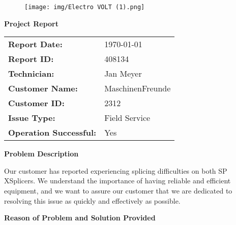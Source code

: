 \documentclass{article}
\begin{document}
\pagestyle{fancy}


\begin{figure}[htbp]
	\centering
	\texttt{[image: img/Electro VOLT (1).png]}
\end{figure}

\begin{center}
    \Huge \textbf{Project Report}
\end{center}

\vspace{5em}

\begin{tabularx}{\textwidth}{@{}l X@{}}
    \textbf{Report Date:} & \today \\
    \textbf{Report ID:} & 408134 \\
    \textbf{Technician:} & Jan Meyer \\
    \textbf{Customer Name:} & MaschinenFreunde \\
    \textbf{Customer ID:} & 2312 \\
    \textbf{Issue Type:} & Field Service \\
    \textbf{Operation Successful:} & Yes \\
\end{tabularx}

\vspace{0.25em}
\newpage

\begin{center}
    \textbf{Problem Description}
\end{center}

\vspace{0.25em}
Our customer has reported experiencing splicing difficulties on both SP XSplicers. We understand the importance of having reliable and efficient equipment, and we want to assure our customer that we are dedicated to resolving this issue as quickly and effectively as possible. 

\vspace{0.25em}

\begin{center}
    \textbf{Reason of Problem and Solution Provided}
\end{center}
\end{document}
